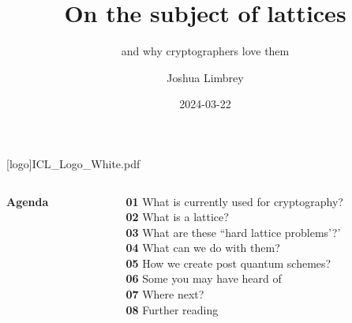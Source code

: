 \documentclass[
aspectratio=169, %
t, %
onlytextwidth, %
10pt, %
]{beamer}
\title{On the subject of lattices} %
\subtitle{and why cryptographers love them} %
\author{Joshua Limbrey} %
\date{2024-03-22} %
\begin{document}




\begingroup
{} %
[logo]{ICL_Logo_White.pdf} %
\frame[plain, s]{\titlepage} %
\endgroup



\begingroup
{} %

\begin{frame}
    \begin{columns}[T] %
        \begin{column}{0.48\linewidth} %
            \HUGE\textbf{Agenda}
        \end{column}
        \begin{column}{0.48\linewidth} %
            \textbf{01} What is currently used for cryptography?\\ %
            \textbf{02} What is a lattice?\\
            \textbf{03} What are these ``hard lattice problems'?'\\
            \textbf{04} What can we do with them?\\
            \textbf{05} How we create post quantum schemes?\\
            \textbf{06} Some you may have heard of\\
            \textbf{07} Where next?\\
            \textbf{08} Further reading
        \end{column}
    \end{columns}
\end{frame}
\endgroup
\end{document}
